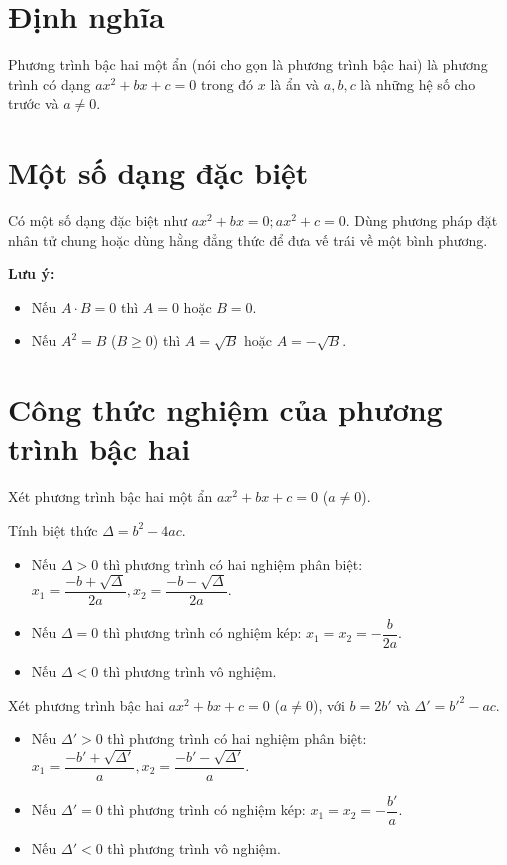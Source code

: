\documentclass[12pt,a4paper]{extarticle}
\begin{document}
\makeheadbox[headerright={Tổng ôn 10-11},chude={CHỦ ĐỀ 01},tieude={Vi-et},dinhdang={Đại số},lop={12 },gv={Nguyễn Lê Minh Ngọc}]

\vspace{2em}
\section{Định nghĩa}
\noindent Phương trình bậc hai một ẩn (nói cho gọn là phương trình bậc hai) là phương trình có dạng $ax^2+bx+c=0$ trong đó $x$ là ẩn và $a,b,c$ là những hệ số cho trước và $a\neq0$. 
\section{Một số dạng đặc biệt}
\noindent Có một số dạng đặc biệt như $ax^2 + bx = 0; ax^2 + c = 0$.
Dùng phương pháp đặt nhân tử chung hoặc dùng hằng đẳng thức để đưa vế trái về một bình phương.

\noindent\textbf{Lưu ý:}
\begin{itemize}
    \item Nếu $A \cdot B = 0$ thì $A = 0$ hoặc $B = 0$.
    \item Nếu $A^2 = B$ ($B \geq 0$) thì $A = \sqrt{B}$ hoặc $A = -\sqrt{B}$.
\end{itemize}
\section{Công thức nghiệm của phương trình bậc hai}
Xét phương trình bậc hai một ẩn $ax^2 + bx + c = 0$ ($a \neq 0$).

\noindent Tính biệt thức $\Delta = b^2 - 4ac$.
\begin{itemize}
    \item Nếu $\Delta > 0$ thì phương trình có hai nghiệm phân biệt: $x_1 = \dfrac{-b + \sqrt{\Delta}}{2a}, x_2 = \dfrac{-b - \sqrt{\Delta}}{2a}$.
    \item Nếu $\Delta = 0$ thì phương trình có nghiệm kép: $x_1 = x_2 = -\dfrac{b}{2a}$.
    \item Nếu $\Delta < 0$ thì phương trình vô nghiệm.
\end{itemize}


\noindent Xét phương trình bậc hai $ax^2 + bx + c = 0$ ($a \neq 0$), với $b = 2b'$ và $\Delta' = b'^2 - ac$.
\begin{itemize}
    \item Nếu $\Delta' > 0$ thì phương trình có hai nghiệm phân biệt: $x_1 = \dfrac{-b' + \sqrt{\Delta'}}{a}, x_2 = \dfrac{-b' - \sqrt{\Delta'}}{a}$.
    \item Nếu $\Delta' = 0$ thì phương trình có nghiệm kép: $x_1 = x_2 = -\dfrac{b'}{a}$.
    \item Nếu $\Delta' < 0$ thì phương trình vô nghiệm.
\end{itemize}
\end{document}
